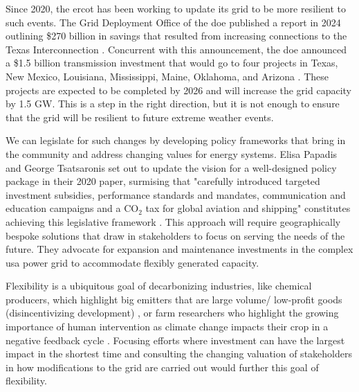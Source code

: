 Since 2020, the \gls{ercot} has been working to update its grid to be more
resilient to such events. The Grid Deployment Office of the \gls{doe} published a report in 2024 outlining \$270 billion in savings that resulted from increasing connections to the Texas Interconnection
\cite{doe_transmission_planning_study_2024}. Concurrent with this announcement,
the \gls{doe} announced a \$1.5 billion transmission investment that would go to
four projects in Texas, New Mexico, Louisiana, Mississippi, Maine, Oklahoma,
and Arizona \cite{doe_tran_announce_2024}. These projects are expected to be
completed by 2026 and will increase the grid capacity by 1.5 GW. This is
a step in the right direction, but it is not enough to ensure that the grid
will be resilient to future extreme weather events.

We can legislate for such changes by developing policy frameworks that bring in
the community and address changing values for energy systems. Elisa Papadis and George Tsatsaronis set out to update the vision for a well-designed policy package in their 2020 paper, surmising that "carefully introduced targeted investment subsidies, performance standards and mandates, communication and education campaigns and a CO$_2$ tax for global aviation and shipping" constitutes achieving this legislative framework \cite{papadis_challenges_2020}. This approach will require geographically bespoke solutions that draw in stakeholders to focus on serving the needs of the future. They advocate for expansion and maintenance investments in the complex \gls{usa} power grid to accommodate flexibly generated capacity.

Flexibility is a ubiquitous goal of decarbonizing industries, like
chemical producers, which highlight big emitters that are large volume/
low-profit goods (disincentivizing development)
\cite{mallapragada_decarbonization_2023}, or farm researchers who highlight the
growing importance of human intervention as climate change impacts their crop
in a negative feedback cycle \cite{farokhi_soofi_farm_2022}. Focusing efforts where investment can have the largest impact in the shortest time and consulting the changing valuation of stakeholders in how modifications to the grid are carried out would further this goal of flexibility.